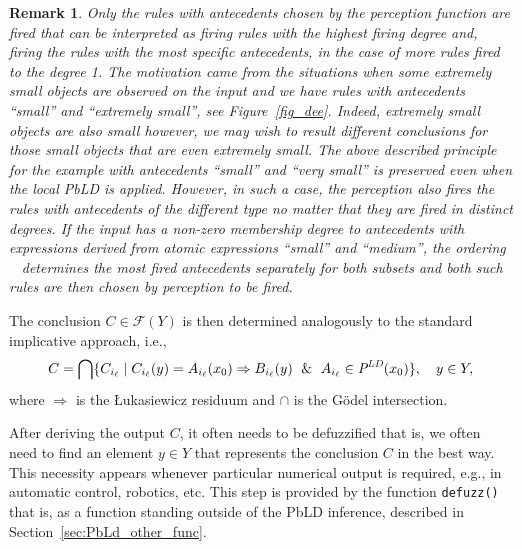 \documentclass[review]{elsarticle}
\newcommand{\code}[1]{\texttt{#1}}
\newtheorem{rem}{Remark}
\newcommand{\LD}{\text{\it LD}}
\newcommand{\LPerc}{\text{\it P}}
\def\llp{\mathop{\le_{x_0} }\nolimits}
\begin{document}
\begin{rem}\label{rem:perception}
Only the rules with antecedents chosen by the perception function are fired that can be interpreted as firing rules with the highest firing degree and, firing the rules with the most specific antecedents, in the case of more rules fired to the degree 1. The motivation came from the situations when some extremely small objects are observed on the input and we have rules with antecedents ``small'' and ``extremely small'', see Figure~\ref{fig_dee}. Indeed, extremely small objects are also small however, we may wish to result different conclusions for those small objects that are even extremely small. The above described principle for the example with antecedents ``small'' and ``very small'' is preserved even when the \emph{local PbLD} is applied. However, in such a case, the perception also fires the rules with antecedents of the different type no matter that they are fired in distinct degrees. If the input has a non-zero membership degree to antecedents with expressions derived from atomic expressions ``small'' and ``medium'', the ordering $\llp$ determines the most fired antecedents separately for both subsets and both such rules are then chosen by perception to be fired.
\end{rem}


The conclusion $C\in\mathcal{F}(Y)$ is then determined analogously to the standard implicative approach, i.e., 
\begin{equation}
C = \bigcap \{C_{i_\ell}\mid
C_{i_\ell}(y)=A_{i_\ell}(x_0)\Rightarrow B_{i_\ell}(y) \; \  \& \; \
A_{i_\ell}\in \LPerc^{\LD}(x_0) \}, \quad y\in Y, \label{form:PBLDconclusion} 
\end{equation}
{\rm where $\Rightarrow$ is the \L ukasiewicz residuum and $\cap$
is the G\"{o}del intersection.}




After deriving the output $C$, it often needs to be defuzzified that is, we often need to find an element $y\in Y$ that represents the conclusion $C$ in the best way. This necessity appears whenever particular numerical output is required, e.g., in automatic control, robotics, etc. This step is provided by the function \code{defuzz()} that is, as a function standing outside of the PbLD inference, described in Section~\ref{sec:PbLd_other_func}.
\end{document}
